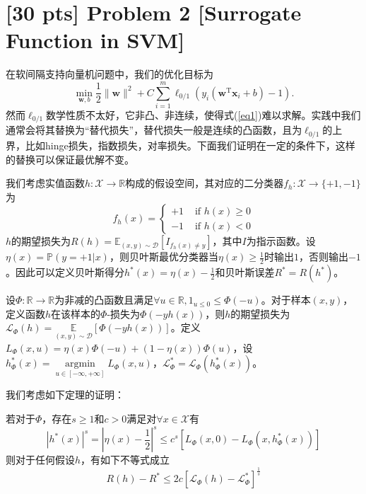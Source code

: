 \documentclass[a4paper,UTF8]{article}
\theoremstyle{definition}
\begin{document}
\section*{[30 pts] Problem 2 [Surrogate Function in SVM]}

在软间隔支持向量机问题中，我们的优化目标为
\begin{equation}\label{eq1}
\min _{\boldsymbol{w}, b} \frac{1}{2}\|\boldsymbol{w}\|^{2}+C \sum_{i=1}^{m} \ell_{0 / 1}\left(y_{i}\left(\boldsymbol{w}^{\mathrm{T}} \boldsymbol{x}_{i}+b\right)-1\right) . 
\end{equation}
然而$\ell_{0 / 1}$数学性质不太好，它非凸、非连续，使得式(\ref{eq1})难以求解。实践中我们通常会将其替换为“替代损失”，替代损失一般是连续的凸函数，且为$\ell_{0 / 1}$的上界，比如hinge损失，指数损失，对率损失。下面我们证明在一定的条件下，这样的替换可以保证最优解不变。

我们考虑实值函数$h:\mathcal{X}\rightarrow\mathbb{R}$构成的假设空间，其对应的二分类器$f_h:\mathcal{X}\rightarrow\{+1,-1\}$为
$$f_{h}(x)=\left\{\begin{array}{ll}
+1 & \text { if } h(x)\geq 0 \\
-1 & \text { if } h(x)<0
\end{array}\right.$$
$h$的期望损失为$R(h)=\mathbb{E}_{(x, y) \sim \mathcal{D}}\left[I_{f_{h}(x) \neq y}\right]$，其中$I$为指示函数。设$\eta(x)=\mathbb{P}(y=+1|x)$，则贝叶斯最优分类器当$\eta(x)\geq \frac{1}{2}$时输出$1$，否则输出$-1$。因此可以定义贝叶斯得分$h^*(x)=\eta(x)-\frac{1}{2}$和贝叶斯误差$R^*=R(h^*)$。

设$\Phi:\mathbb{R}\rightarrow\mathbb{R}$为非减的凸函数且满足$\forall u\in \mathbb{R},1_{u\leq 0}\leq \Phi(-u)$。对于样本$(x,y)$，定义函数$h$在该样本的$\Phi$-损失为$\Phi(-yh(x))$，则$h$的期望损失为$\mathcal{L}_{\Phi}(h)=\underset{(x, y) \sim \mathcal{D}}{\mathbb{E}}[\Phi(-y h(x))]$。定义$L_{\Phi}(x, u)=\eta(x) \Phi(-u)+(1-\eta(x)) \Phi(u)$，设$h_{\Phi}^{*}(x)=\underset{u \in[-\infty,+\infty]}{\operatorname{argmin}} L_{\Phi}(x, u)$，$\mathcal{L}_{\Phi}^{*}=\mathcal{L}_{\Phi}(h_{\Phi}^{*}(x))$。

我们考虑如下定理的证明：

若对于$\Phi$，存在$s\geq 1$和$c>0$满足对$\forall x\in\mathcal{X}$有
\begin{equation}\label{eq2}
\left|h^{*}(x)\right|^{s}=\left|\eta(x)-\frac{1}{2}\right|^{s} \leq c^{s}\left[L_{\Phi}(x, 0)-L_{\Phi}\left(x, h_{\Phi}^{*}(x)\right)\right]
\end{equation}
则对于任何假设$h$，有如下不等式成立
\begin{equation}\label{eq3}
R(h)-R^{*} \leq 2 c\left[\mathcal{L}_{\Phi}(h)-\mathcal{L}_{\Phi}^{*}\right]^{\frac{1}{s}}
\end{equation}
\end{document}
